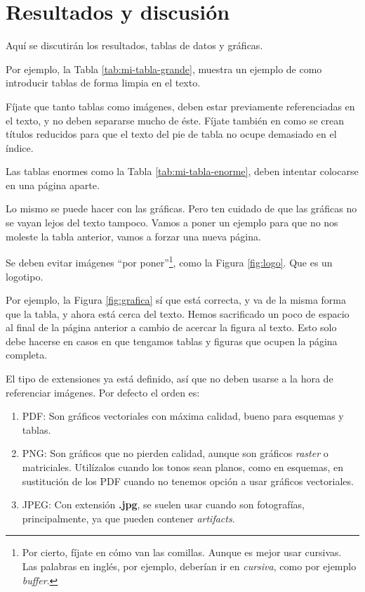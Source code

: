\chapter{Resultados y discusión}\label{chapter:resultados}

Aquí se discutirán los resultados, tablas de datos y gráficas.

Por ejemplo, la Tabla \ref{tab:mi-tabla-grande}, muestra un ejemplo de como introducir tablas de forma limpia en el texto.



Fíjate que tanto tablas como imágenes, deben estar previamente referenciadas en el texto, y no deben separarse mucho de éste. Fíjate también en como se crean títulos reducidos para que el texto del pie de tabla no ocupe demasiado en el índice.

Las tablas enormes como la Tabla \ref{tab:mi-tabla-enorme}, deben intentar colocarse en una página aparte.



Lo mismo se puede hacer con las gráficas. Pero ten cuidado de que las gráficas no se vayan lejos del texto tampoco. Vamos a poner un ejemplo para que no nos moleste la tabla anterior, vamos a forzar una nueva página.

\newpage

Se deben evitar imágenes ``por poner''\footnote{Por cierto, fíjate en cómo van las comillas. Aunque es mejor usar cursivas. Las palabras en inglés, por ejemplo, deberían ir en \emph{cursiva}, como por ejemplo \emph{buffer}.}, como la Figura \ref{fig:logo}. Que es un logotipo. 



Por ejemplo, la Figura \ref{fig:grafica} sí que está correcta, y va de la misma forma que la tabla, y ahora está cerca del texto. Hemos sacrificado un poco de espacio al final de la página anterior a cambio de acercar la figura al texto. Esto solo debe hacerse en casos en que tengamos tablas y figuras que ocupen la página completa.



El tipo de extensiones ya está definido, así que no deben usarse a la hora de referenciar imágenes. Por defecto el orden es:

\begin{enumerate}
    \item PDF: Son gráficos vectoriales con máxima calidad, bueno para esquemas y tablas.
    \item PNG: Son gráficos que no pierden calidad, aunque son gráficos \emph{raster} o matriciales. Utilízalos cuando los tonos sean planos, como en esquemas, en sustitución de los PDF cuando no tenemos opción a usar gráficos vectoriales.
    \item JPEG: Con extensión \textbf{.jpg}, se suelen usar cuando son fotografías, principalmente, ya que pueden contener \emph{artifacts}.
\end{enumerate}